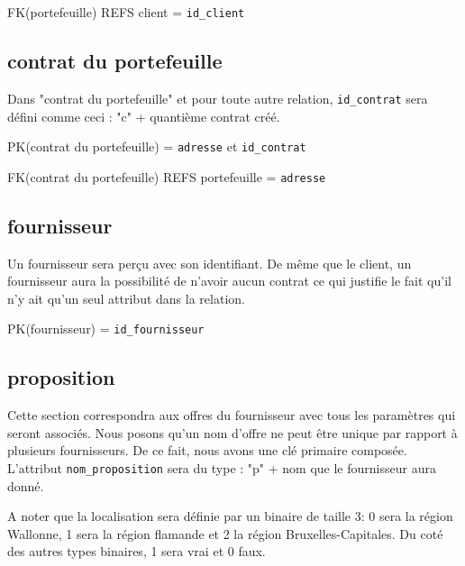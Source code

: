 \begin{flushleft}
FK(portefeuille) REFS client = \texttt{id\_client}
\end{flushleft}
\subsection{contrat du portefeuille}
\begin{flushleft}
 Dans "contrat du portefeuille" et pour toute autre relation, \texttt{id\_contrat} sera défini comme ceci : "c" + quantième contrat créé.
\end{flushleft}

\begin{flushleft}
PK(contrat du portefeuille) = \texttt{adresse} et \texttt{id\_contrat}
\end{flushleft}

\begin{flushleft}
FK(contrat du portefeuille) REFS portefeuille = \texttt{adresse}
\end{flushleft}
\subsection{fournisseur}
\begin{flushleft}
Un fournisseur sera perçu avec son identifiant. De même que le client, un fournisseur aura la possibilité de n'avoir aucun contrat ce qui justifie le fait qu'il n'y ait qu'un seul attribut dans la relation.
\end{flushleft}

\begin{flushleft}
PK(fournisseur) = \texttt{id\_fournisseur}
\end{flushleft}
\subsection{proposition}
\begin{flushleft}
Cette section correspondra aux offres du fournisseur avec tous les paramètres qui seront associés. Nous posons qu'un nom d'offre ne peut être unique par rapport à plusieurs fournisseurs. De ce fait, nous avons une clé primaire composée. L'attribut \texttt{nom\_proposition} sera du type : "p" + nom que le fournisseur aura donné.
\end{flushleft}

\begin{flushleft}
A noter que la localisation sera définie par un binaire de taille 3: 0 sera la région Wallonne, 1 sera la région flamande et 2 la région Bruxelles-Capitales. Du coté des autres types binaires, 1 sera vrai et 0 faux. 
\end{flushleft}

